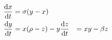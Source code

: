 \documentclass[preview]{standalone}
\begin{document}
\begin{align*}
\special{dvisvgm:raw <g id='unique000'>}
            \frac{\mathrm{d} x}{\mathrm{d} t} &= \sigma(y-x) \\
            \frac{\mathrm{d} y}{\mathrm{d} t} &= x(\rho-z)-y
            \frac{\mathrm{d} z}{\mathrm{d} t} &= x y-\beta z
            \special{dvisvgm:raw </g>}
\end{align*}
\end{document}
